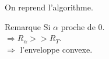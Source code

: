 \begin{frame}
\begin{columns}[t]
\begin{column}{3cm}
\begin{block}{}
{        }
        {
          On reprend l'algorithme.
        }
      \end{block}
      {
        \begin{block}{Remarque}
          \alert{Si $\alpha$ proche de 0.}\\
          \alert{$\Rightarrow R_{\alpha} >> R_T$.}\\
          \alert{$\Rightarrow$ l'enveloppe convexe.}\\

        \end{block}
      }     
    \end{column}
  \end{columns}
\end{frame}



